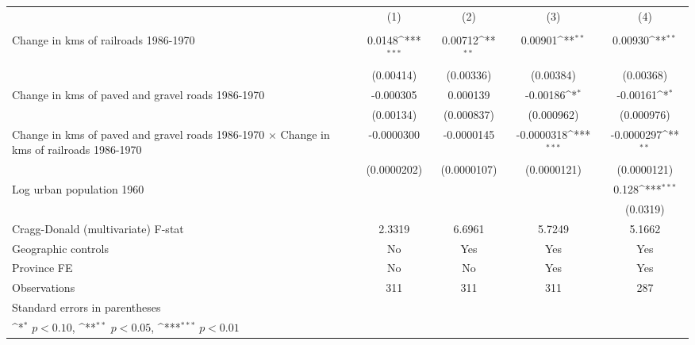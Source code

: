 {
\def\sym#1{\ifmmode^{#1}\else\(^{#1}\)\fi}
\begin{tabular}{l*{4}{c}}
\hline\hline
                &\multicolumn{1}{c}{(1)}&\multicolumn{1}{c}{(2)}&\multicolumn{1}{c}{(3)}&\multicolumn{1}{c}{(4)}\\
                &\multicolumn{1}{c}{}&\multicolumn{1}{c}{}&\multicolumn{1}{c}{}&\multicolumn{1}{c}{}\\
\hline
Change in kms of railroads 1986-1970&   0.0148\sym{***}&  0.00712\sym{**} &  0.00901\sym{**} &  0.00930\sym{**} \\
                &(0.00414)         &(0.00336)         &(0.00384)         &(0.00368)         \\
[1em]
Change in kms of paved and gravel roads 1986-1970&-0.000305         & 0.000139         & -0.00186\sym{*}  & -0.00161\sym{*}  \\
                &(0.00134)         &(0.000837)         &(0.000962)         &(0.000976)         \\
[1em]
Change in kms of paved and gravel roads 1986-1970 $\times$ Change in kms of railroads 1986-1970&-0.0000300         &-0.0000145         &-0.0000318\sym{***}&-0.0000297\sym{**} \\
                &(0.0000202)         &(0.0000107)         &(0.0000121)         &(0.0000121)         \\
[1em]
Log urban population 1960&                  &                  &                  &    0.128\sym{***}\\
                &                  &                  &                  & (0.0319)         \\
\hline
Cragg-Donald (multivariate) F-stat&   2.3319         &   6.6961         &   5.7249         &   5.1662         \\
Geographic controls&       No         &      Yes         &      Yes         &      Yes         \\
Province FE     &       No         &       No         &      Yes         &      Yes         \\
Observations    &      311         &      311         &      311         &      287         \\
\hline\hline
\multicolumn{5}{l}{\footnotesize Standard errors in parentheses}\\
\multicolumn{5}{l}{\footnotesize \sym{*} \(p<0.10\), \sym{**} \(p<0.05\), \sym{***} \(p<0.01\)}\\
\end{tabular}
}

